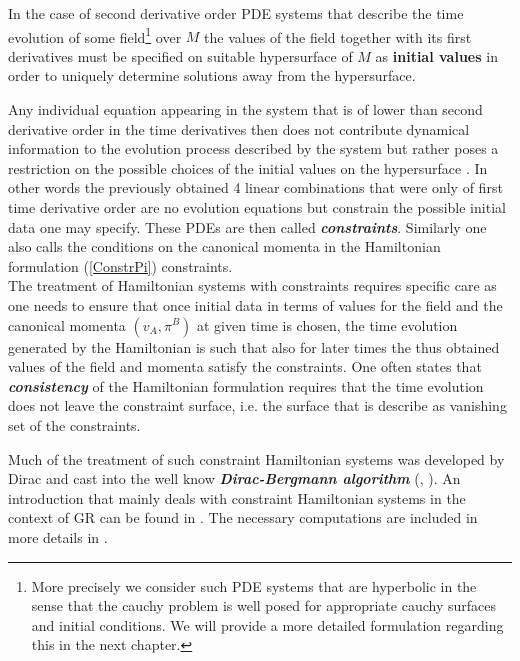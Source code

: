 \documentclass[a4paper,12pt, DIV=14, BCOR=5mm, twoside, headsepline]{scrbook}
\begin{document}
In the case of second derivative order PDE systems that describe the time evolution of some field\footnote{More precisely we consider such PDE systems that are hyperbolic in the sense that the cauchy problem is well posed for appropriate cauchy surfaces and initial conditions. We will provide a more detailed formulation regarding this in the next chapter.} over $M$ the values of the field together with its first derivatives must be specified on suitable hypersurface of $M$ as \textbf{\textbf{initial values}} in order to uniquely determine solutions away from the hypersurface. 


Any individual equation appearing in the system that is of lower than second derivative order in the time derivatives then does not contribute dynamical information to the evolution process described by the system but  rather poses a restriction on the possible choices of the initial values on the hypersurface . In other words the previously obtained 4 linear combinations that were only of first time derivative order are no evolution equations but  constrain the possible initial data one may specify. These PDEs are then called \textbf{\textit{constraints}}.
Similarly one also calls the conditions on the canonical momenta in the Hamiltonian formulation (\ref{ConstrPi}) constraints.\\

The treatment of Hamiltonian systems with constraints requires specific care as one needs to ensure that once initial data in terms of values for the field and the canonical momenta $(v_A,\pi^B)$ at given time is chosen, the time evolution generated by the Hamiltonian is such that also for later times the thus obtained values of the field and momenta satisfy the constraints. One often states that \textbf{\textit{consistency}} of the Hamiltonian formulation requires that the time evolution does not leave the constraint surface, i.e. the surface that is describe as vanishing set of the constraints.

Much of the treatment of such constraint Hamiltonian systems was developed by Dirac \cite{dirac_1950} and cast into the well know \textit{\textbf{Dirac-Bergmann algorithm}} (\cite{PhysRev.83.1018}, \cite{doi:10.1063/1.523597}). An introduction that mainly deals with constraint Hamiltonian systems in the context of GR can be found in \cite{bojowald_2010}. The necessary computations are included in more details in \cite{thiemann_2007}. \\
\end{document}
